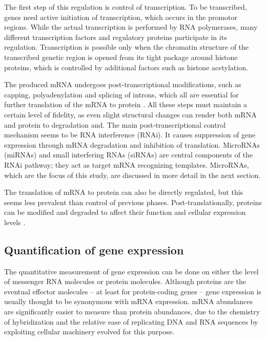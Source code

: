 The first step of this regulation is control of transcription. To be
transcribed, genes need active initiation of transcription, which
occurs in the promotor regions. While the actual transcription is performed by
RNA polymerases, many different transcription factors and regulatory proteins
participate in its regulation. Transcription is possible only when
the chromatin structure of the transcribed genetic region is opened from its
tight package around histone proteins, which is controlled by additional
factors such as histone acetylation.

The produced mRNA undergoes post-transcriptional modifications, such as
capping, polyadenylation and splicing of introns, which all are essential for
further translation of the mRNA to protein \citep{Strachan2011}. All these
steps must maintain a certain level of fidelity, as even slight structural
changes can render both mRNA and protein to degradation and. The main
post-transcriptional control mechanism seems to be RNA interference (RNAi). It
causes suppression of gene expression through mRNA degradation and inhibition of translation.
MicroRNAs (miRNAs) and small interfering RNAs (siRNAs) are central components of the
RNAi pathway; they act as target mRNA recognizing templates. \cite{Du2005}
MicroRNAs, which are the focus of this study, are discussed in more detail in the next section.

The translation of mRNA to protein can also be directly regulated, but this
seems less prevalent than control of previous phases. Post-translationally,
proteins can be modified and degraded to affect their function and cellular
expression levels \citep{Strachan2011}.




\subsection{Quantification of gene expression}\label{measurement-of-gene-expression}

The quantitative measurement of gene expression can be done on either the level of
messenger RNA molecules or protein molecules. Although proteins are the
eventual effector molecules -- at least for protein-coding genes
-- gene expression is usually thought to be synonymous with mRNA expression.
mRNA abundances are significantly easier to measure
than protein abundances, due to the chemistry of hybridization and
the relative ease of replicating DNA and RNA sequences by exploiting cellular
machinery evolved for this purpose.

